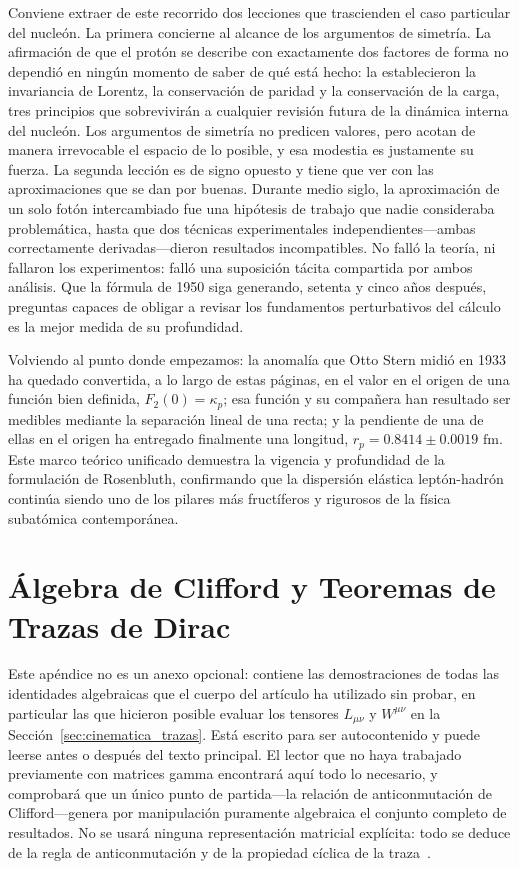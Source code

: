 \documentclass[10pt,a4paper]{article}
\begin{document}
Conviene extraer de este recorrido dos lecciones que trascienden el caso particular del nucleón. La primera concierne al alcance de los argumentos de simetría. La afirmación de que el protón se describe con exactamente dos factores de forma no dependió en ningún momento de saber de qué está hecho: la establecieron la invariancia de Lorentz, la conservación de paridad y la conservación de la carga, tres principios que sobrevivirán a cualquier revisión futura de la dinámica interna del nucleón. Los argumentos de simetría no predicen valores, pero acotan de manera irrevocable el espacio de lo posible, y esa modestia es justamente su fuerza. La segunda lección es de signo opuesto y tiene que ver con las aproximaciones que se dan por buenas. Durante medio siglo, la aproximación de un solo fotón intercambiado fue una hipótesis de trabajo que nadie consideraba problemática, hasta que dos técnicas experimentales independientes---ambas correctamente derivadas---dieron resultados incompatibles. No falló la teoría, ni fallaron los experimentos: falló una suposición tácita compartida por ambos análisis. Que la fórmula de 1950 siga generando, setenta y cinco años después, preguntas capaces de obligar a revisar los fundamentos perturbativos del cálculo es la mejor medida de su profundidad.

Volviendo al punto donde empezamos: la anomalía que Otto Stern midió en 1933 ha quedado convertida, a lo largo de estas páginas, en el valor en el origen de una función bien definida, $F_2(0) = \kappa_p$; esa función y su compañera han resultado ser medibles mediante la separación lineal de una recta; y la pendiente de una de ellas en el origen ha entregado finalmente una longitud, $r_p = 0.8414 \pm 0.0019\text{ fm}$. Este marco teórico unificado demuestra la vigencia y profundidad de la formulación de Rosenbluth, confirmando que la dispersión elástica leptón-hadrón continúa siendo uno de los pilares más fructíferos y rigurosos de la física subatómica contemporánea.

\appendix
\section{Álgebra de Clifford y Teoremas de Trazas de Dirac}
\label{sec:apendice_dirac}

Este apéndice no es un anexo opcional: contiene las demostraciones de todas las identidades algebraicas que el cuerpo del artículo ha utilizado sin probar, en particular las que hicieron posible evaluar los tensores $L_{\mu\nu}$ y $W^{\mu\nu}$ en la Sección~\ref{sec:cinematica_trazas}. Está escrito para ser autocontenido y puede leerse antes o después del texto principal. El lector que no haya trabajado previamente con matrices gamma encontrará aquí todo lo necesario, y comprobará que un único punto de partida---la relación de anticonmutación de Clifford---genera por manipulación puramente algebraica el conjunto completo de resultados. No se usará ninguna representación matricial explícita: todo se deduce de la regla de anticonmutación y de la propiedad cíclica de la traza~\cite{griffiths2008,halzen1984,thomson2013}.
\end{document}
